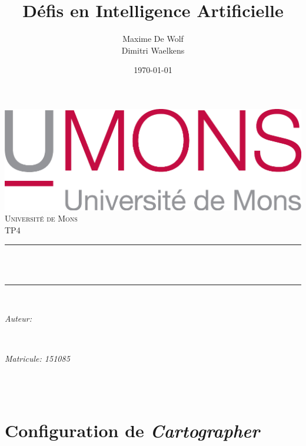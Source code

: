 \documentclass[10pt,a4paper]{article}
\title{Défis en Intelligence Artificielle}                             %
\author{Maxime De Wolf\\
		Dimitri Waelkens}                               %
\date{\today}                                           %
\makeatletter
\let\thetitle\@title
\let\theauthor\@author
\let\thedate\@date
\makeatother
\begin{document}
   	
   	
   	\begin{titlepage}
   		\centering
   		\vspace*{0.5 cm}
   		\includegraphics[scale = 0.75]{UMONS}\\[1.0 cm]   %
   		\textsc{\LARGE Université de Mons}\\[2.0 cm]   %
   		\textsc{\large TP4}\\[0.5 cm]               %
   		\rule{\linewidth}{0.2 mm} \\[0.4 cm]
   		{ \huge \bfseries \thetitle}\\
   		\rule{\linewidth}{0.2 mm} \\[1.5 cm]
   		
   		\begin{minipage}{0.4\textwidth}
   			\begin{flushleft} \large
   				\emph{Auteur:}\\
   				\theauthor
   			\end{flushleft}
   		\end{minipage}~
   		\begin{minipage}{0.4\textwidth}
   			\begin{flushright} \large
   				\emph{Matricule: 151085}                                  %
   			\end{flushright}
   		\end{minipage}\\[2 cm]
   		
   		{\large \thedate}\\[2 cm]
   		
   		\vfill
   		
   	\end{titlepage}
   	
   	
   	\section{Configuration de \textit{Cartographer}}
	
\end{document}
